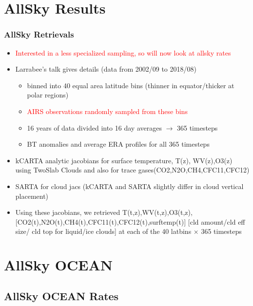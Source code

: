 \documentclass[10pt,t]{beamer}
\begin{document}
\section{AllSky Results}

\begin{frame}
  \frametitle{AllSky Retrievals}
  \begin{itemize}
    \item \textcolor{red}{Interested in a less specialized sampling, so will now look at allsky rates}
    \item Larrabee's talk gives details (data from 2002/09 to 2018/08)
      \begin{itemize}
        \item binned into 40 equal area latitude bins (thinner in equator/thicker at polar regions)
        \item \textcolor{red}{AIRS observations randomly sampled from these bins}
        \item 16 years of data divided into 16 day averages $\rightarrow$ 365 timesteps
        \item BT anomalies and average ERA profiles for all 365 timesteps
      \end{itemize}
    \item kCARTA analytic jacobians for surface temperature, T(z), WV(z),O3(z) using TwoSlab Clouds
          and also for trace gases(CO2,N2O,CH4,CFC11,CFC12)
    \item SARTA for cloud jacs (kCARTA and SARTA slightly differ in cloud vertical placement)
    \item Using these jacobians, we retrieved T(t,z),WV(t,z),O3(t,z),[CO2(t),N2O(t),CH4(t),CFC11(t),CFC12(t),surftemp(t)]
          [cld amount/cld eff size/ cld top for liquid/ice clouds] at each of the 40 latbins $\times $ 365 timesteps
  \end{itemize}
\end{frame}


\section{AllSky OCEAN}
\subsection{AllSky OCEAN Rates}
\end{document}
